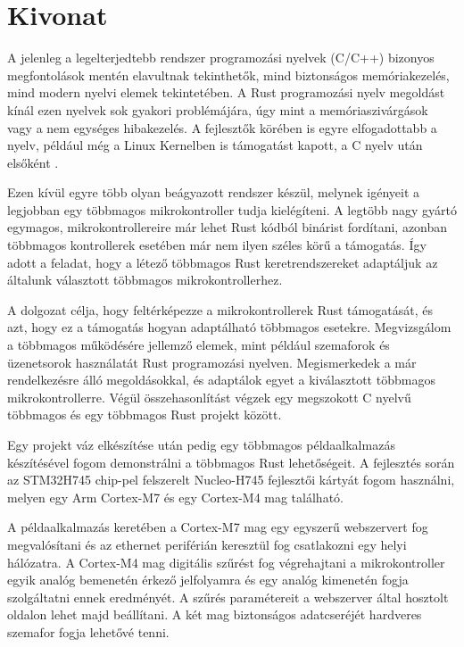 \setcounter{page}{1}

\selecthungarian

\chapter*{Kivonat}

A jelenleg a legelterjedtebb rendszer programozási nyelvek (C/C++) bizonyos megfontolások mentén elavultnak tekinthetők, mind biztonságos memóriakezelés, mind modern nyelvi elemek tekintetében. A Rust programozási nyelv megoldást kínál ezen nyelvek sok gyakori problémájára, úgy mint a memóriaszivárgások vagy a nem egységes hibakezelés. A fejlesztők körében is egyre elfogadottabb a nyelv, például még a Linux Kernelben is támogatást kapott, a C nyelv után elsőként \cite{FirstRustCommit}.

Ezen kívül egyre több olyan beágyazott rendszer készül, melynek igényeit a legjobban egy többmagos mikrokontroller tudja kielégíteni. A legtöbb nagy gyártó egymagos, mikrokontrollereire már lehet Rust kódból binárist fordítani, azonban többmagos kontrollerek esetében már nem ilyen széles körű a támogatás. Így adott a feladat, hogy a létező többmagos Rust keretrendszereket adaptáljuk az általunk választott többmagos mikrokontrollerhez.

A dolgozat célja, hogy feltérképezze a mikrokontrollerek Rust támogatását, és azt, hogy ez a támogatás hogyan adaptálható többmagos esetekre. Megvizsgálom a többmagos működésére jellemző elemek, mint például szemaforok és üzenetsorok használatát Rust programozási nyelven. Megismerkedek a már rendelkezésre álló megoldásokkal, és adaptálok egyet a kiválasztott többmagos mikrokontrollerre. Végül összehasonlítást végzek egy megszokott C nyelvű többmagos és egy többmagos Rust projekt között.

Egy projekt váz elkészítése után pedig egy többmagos példaalkalmazás készítésével fogom demonstrálni a többmagos Rust lehetőségeit. A fejlesztés során az STM32H745 chip-pel felszerelt Nucleo-H745 fejlesztői kártyát fogom használni, melyen egy Arm Cortex-M7 és egy Cortex-M4 mag található.

A példaalkalmazás keretében a Cortex-M7 mag egy egyszerű webszervert fog megvalósítani és az ethernet periférián keresztül fog csatlakozni egy helyi hálózatra. A Cortex-M4 mag digitális szűrést fog végrehajtani a mikrokontroller egyik analóg bemenetén érkező jelfolyamra és egy analóg kimenetén fogja szolgáltatni ennek eredményét. A szűrés paramétereit a webszerver által hosztolt oldalon lehet majd beállítani. A két mag biztonságos adatcseréjét hardveres szemafor fogja lehetővé tenni.

